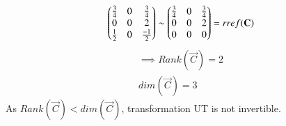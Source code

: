 \documentclass[journal,12pt,twocolumn]{IEEEtran}
\begin{document}
\begin{enumerate}
\begin{align}
\begin{pmatrix}\frac{3}{4}&0&\frac{3}{4}\\0&0&2\\\frac{1}{2}&0&\frac{-1}{2}\end{pmatrix} \sim \begin{pmatrix}\frac{3}{4}&0&\frac{3}{4}\\0&0&2\\0&0&0\end{pmatrix}=rref(\mathbf{C})
\end{align}
\begin{align}
\implies Rank(\vec{C})=2 \label{RankC}\\
dim(\vec{C})=3
\end{align}
As $Rank(\vec{C})<dim(\vec{C})$, transformation UT is not invertible.
\end{enumerate}
\end{document}

